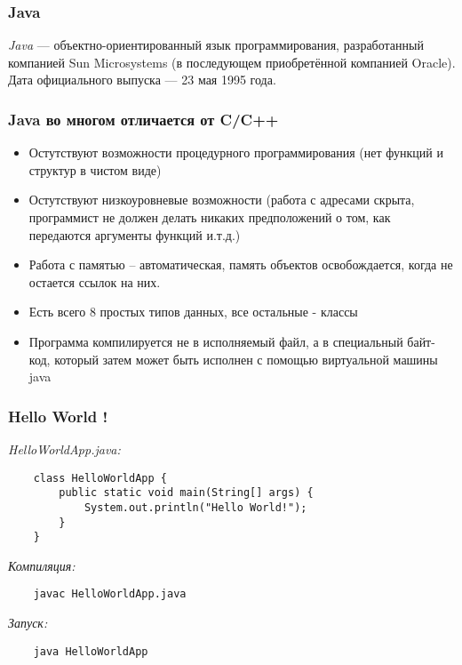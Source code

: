 \begin{frame}
	\frametitle{Java}

	\begin{Large}
	\emph{Java} — объектно-ориентированный язык программирования, разработанный компанией Sun Microsystems (в последующем приобретённой компанией Oracle). Дата официального выпуска — 23 мая 1995 года.
	\end{Large}
\end{frame}

\begin{frame}
	\frametitle{Java во многом отличается от C/C++}

	\begin{itemize}
		\item{Остутствуют возможности процедурного программирования (нет функций и структур в чистом виде)}
		\item{Остутствуют низкоуровневые возможности (работа с адресами скрыта, программист не должен делать никаких предположений о том, как передаются аргументы функций и.т.д.)}
		\item{Работа с памятью -- автоматическая, память объектов освобождается, когда не остается ссылок на них.}
		\item{Есть всего 8 простых типов данных, все остальные - классы}
		\item{Программа компилируется не в исполняемый файл, а в специальный байт-код, который затем может быть исполнен с помощью виртуальной машины java}
	\end{itemize}

\end{frame}


\begin{frame}[fragile]
	\frametitle{Hello World !}

	\begin{large}
	\emph{HelloWorldApp.java:}
	\begin{verbatim}
	class HelloWorldApp {
	    public static void main(String[] args) {
	        System.out.println("Hello World!");
	    }
	}
	\end{verbatim}

	\emph{Компиляция:}
	\begin{verbatim}
	javac HelloWorldApp.java
	\end{verbatim}

	\emph{Запуск:}
	\begin{verbatim}
	java HelloWorldApp
	\end{verbatim}
	\end{large}

\end{frame}

